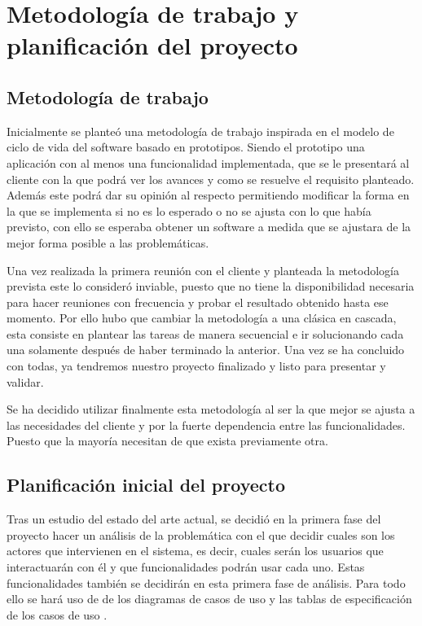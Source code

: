 \section{Metodología de trabajo y planificación del proyecto}
\subsection{Metodología de trabajo}
Inicialmente se planteó una metodología de trabajo inspirada en el modelo de ciclo de vida del software
basado en prototipos. Siendo el prototipo una aplicación con al menos una funcionalidad implementada,
que se le presentará al cliente con la que podrá ver los avances y como se resuelve el requisito planteado.
Además este podrá dar su opinión al respecto permitiendo modificar la forma en la que se implementa si no
es lo esperado o no se ajusta con lo que había previsto, con ello se esperaba obtener un software a
medida que se ajustara de la mejor forma posible a las problemáticas.

\medskip
Una vez realizada la primera reunión con el cliente y planteada la metodología prevista este lo consideró
inviable, puesto que no tiene la disponibilidad necesaria para hacer reuniones con frecuencia y probar el
resultado obtenido hasta ese momento. Por ello hubo que cambiar la metodología a una clásica en cascada,
esta consiste en plantear las tareas de manera secuencial e ir solucionando cada una solamente después de
haber terminado la anterior. Una vez se ha concluido con todas, ya tendremos nuestro proyecto finalizado
y listo para presentar y validar.

\medskip
Se ha decidido utilizar finalmente esta metodología al ser la que mejor se ajusta a las necesidades del
cliente y por la fuerte dependencia entre las funcionalidades. Puesto que la mayoría necesitan de que
exista previamente otra.

\subsection{Planificación inicial del proyecto}
Tras un estudio del estado del arte actual, se decidió en la primera fase del proyecto hacer un análisis
de la problemática con el que decidir cuales son los actores que intervienen en el sistema, es decir,
cuales serán los usuarios que interactuarán con él y que funcionalidades podrán usar cada uno. Estas
funcionalidades también se decidirán en esta primera fase de análisis. Para todo ello se hará uso de
de los diagramas de casos de uso \cite{casos-de-uso} y las tablas de especificación de los casos de
uso \cite{tabla-especificacion-casos-de-uso}.

